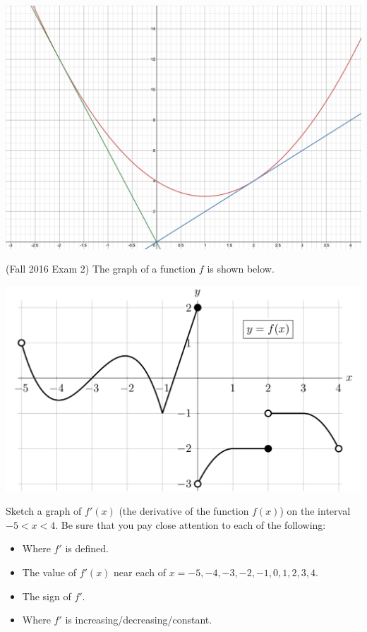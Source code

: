 \documentclass[11pt]{exam}
\begin{document}
\begin{questions}
\begin{solution}
\begin{center}
      \includegraphics[scale=0.3]{Figures/parabola_with_tangents}
     \end{center}
    \end{solution}
  \question (Fall 2016 Exam 2) The graph of a function $f$ is shown below.
    \begin{center}
      \includegraphics[scale=0.6]{Figures/graphf.png}
    \end{center}
    Sketch a graph of $f'(x)$ (the derivative of the function $f(x)$) on the interval
$-5 < x < 4$. Be sure that you pay close attention to each of the following:
 \begin{itemize}
\item Where $f'$ is defined.
\item The value of $f'(x)$ near each of $x = -5, -4, -3, -2, -1, 0, 1, 2, 3, 4$.
\item The sign of $f'$.
\item Where $f'$ is increasing/decreasing/constant.
\end{itemize}

\end{questions}
\end{document}
